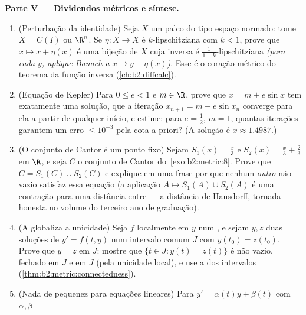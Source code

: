 \begin{problem}
\medskip
\noindent\textbf{Parte V --- Dividendos métricos e síntese.}
\begin{enumerate}[resume]
  \item (Perturbação da identidade) Seja $X$ um palco 
        do tipo espaço normado: tome $X = C(I)$ ou $\R^n$. Se
        $\eta \colon X \to X$ é $k$-lipschitziana com $k < 1$,
        prove que $x \mapsto x + \eta(x)$ é uma bijeção de $X$
        cuja inversa é $\frac1{1-k}$-lipschitziana \emph{(para cada
        $y$, aplique Banach a $x \mapsto y - \eta(x)$)}. Esse é
        o coração métrico do teorema da função inversa
        (\cref{ch:b2:diffcalc}).
  \item (Equação de Kepler) Para $0 \leq e < 1$ e $m \in \R$,
        prove que $x = m + e\sin x$ tem exatamente uma solução,
        que a iteração $x_{n+1} = m + e\sin x_n$ converge
        para ela a partir de qualquer início, e estime: para $e = \frac12$,
        $m = 1$, quantas iterações garantem um erro $\leq
        10^{-3}$ pela cota a priori? (A solução é $x
        \approx 1.4987$.)
  \item (O conjunto de Cantor é um ponto fixo) Sejam $S_1(x) = \frac
        x3$ e $S_2(x) = \frac x3 + \frac23$ em $\R$, e seja
        $C$ o conjunto de Cantor do~\cref{exo:b2:metric:8}. Prove que
        $C = S_1(C) \cup S_2(C)$ e explique em uma frase
        por que nenhum \emph{outro}  não vazio satisfaz essa
        equação (a aplicação $A \mapsto S_1(A) \cup S_2(A)$ é uma
        contração para uma distância entre  --- a
        distância de Hausdorff, tornada honesta no volume do terceiro ano de graduação).
  \item (A  globaliza a unicidade) Seja $f$ localmente
         em $y$ num , e sejam $y, z$ duas
        soluções de $y' = f(t, y)$ num intervalo comum $J$
        com $y(t_0) = z(t_0)$. Prove que $y = z$ em $J$: mostre que
        $\{t \in J : y(t) = z(t)\}$ é não vazio, fechado em $J$
        e  em $J$ (pela unicidade local), e use a
         dos intervalos
        (\cref{thm:b2:metric:connectedness}).
  \item (Nada de pequenez para equações lineares) Para $y' =
        \alpha(t)y + \beta(t)$ com $\alpha, \beta$ 

\end{enumerate}
\end{problem}
